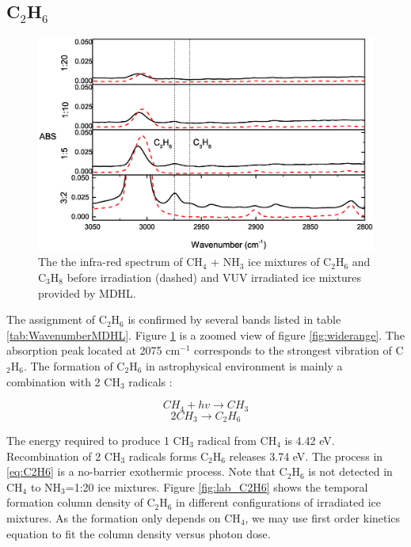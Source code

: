 \subsection{C$_2$H$_6$}

\begin{figure}
\centering
\includegraphics[width=\textwidth]{figures/chapter3/C2H6.eps}
\caption{The the infra-red spectrum of CH$_4$ + NH$_3$ ice mixtures of C$_2$H$_6$ and C$_3$H$_8$ before irradiation (dashed) and VUV irradiated ice mixtures provided by MDHL. }
\label{fig:C2H6}
\end{figure}

The assignment of C$_2$H$_6$ is confirmed by several bands listed in table \ref{tab:WavenumberMDHL}. Figure \ref{fig:C2H6} is a zoomed view of figure \ref{fig:widerange}. The absorption peak located at 2075 cm$^{-1}$ corresponds to the strongest vibration of C$_2$H$_6$. The formation of C$_2$H$_6$ in astrophysical environment is mainly a combination with 2 CH$_3$ radicals \cite{bennett2006laboratory}:

\begin{equation}
CH_4 + hv \rightarrow CH_3
\label{eq:CH3}
\end{equation}
\begin{equation}
2 CH_3 \rightarrow C_2H_6
\label{eq:C2H6}
\end{equation}

The energy required to produce 1 CH$_3$ radical from CH$_4$ is 4.42 eV.  Recombination of 2 CH$_3$ radicals forms C$_2$H$_6$ releases 3.74 eV. The process in \ref{eq:C2H6} is a no-barrier exothermic process. Note that C$_2$H$_6$ is not detected in CH$_4$ to NH$_3$=1:20 ice mixtures. Figure \ref{fig:lab_C2H6} shows the temporal formation column density of C$_2$H$_6$ in different configurations of irradiated ice mixtures.  As the formation only depends on CH$_4$, we may use first order kinetics equation to fit the column density versus photon dose.

